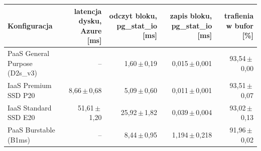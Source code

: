 \begin{tabular}{lrrrr}
\toprule
Konfiguracja & latencja dysku, Azure [ms] & odczyt bloku, pg\_stat\_io [ms] & zapis bloku, pg\_stat\_io [ms] & trafienia w bufor [\%] \\
\midrule
PaaS General Purpose (D2s\_v3) & -- & 1,60\,$\pm$\,0,19 & 0,015\,$\pm$\,0,001 & 93,54\,$\pm$\,0,00 \\
IaaS Premium SSD P20 & 8,66\,$\pm$\,0,68 & 5,09\,$\pm$\,0,60 & 0,011\,$\pm$\,0,001 & 93,51\,$\pm$\,0,07 \\
IaaS Standard SSD E20 & 51,61\,$\pm$\,1,20 & 25,92\,$\pm$\,1,82 & 0,039\,$\pm$\,0,004 & 93,02\,$\pm$\,0,13 \\
PaaS Burstable (B1ms) & -- & 8,44\,$\pm$\,0,95 & 1,194\,$\pm$\,0,218 & 91,96\,$\pm$\,0,02 \\
\bottomrule
\end{tabular}

